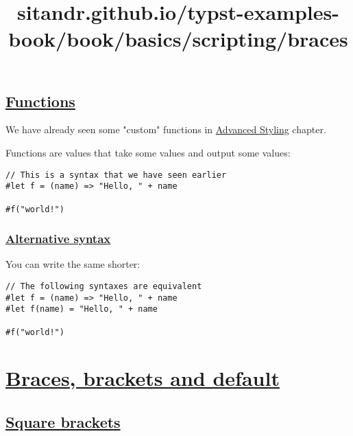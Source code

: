 \pandocbounded{}

\subsection{\texorpdfstring{\hyperref[functions]{Functions}}{Functions}}\label{functions}

We have already seen some "custom" functions in
\href{../tutorial/advanced_styling.html}{Advanced Styling} chapter.

Functions are values that take some values and output some values:

\begin{verbatim}
// This is a syntax that we have seen earlier
#let f = (name) => "Hello, " + name

#f("world!")
\end{verbatim}

\pandocbounded{}

\subsubsection{\texorpdfstring{\hyperref[alternative-syntax]{Alternative
syntax}}{Alternative syntax}}\label{alternative-syntax}

You can write the same shorter:

\begin{verbatim}
// The following syntaxes are equivalent
#let f = (name) => "Hello, " + name
#let f(name) = "Hello, " + name

#f("world!")
\end{verbatim}

\pandocbounded{}


\title{sitandr.github.io/typst-examples-book/book/basics/scripting/braces}

\section{\texorpdfstring{\hyperref[braces-brackets-and-default]{Braces,
brackets and
default}}{Braces, brackets and default}}\label{braces-brackets-and-default}

\subsection{\texorpdfstring{\hyperref[square-brackets]{Square
brackets}}{Square brackets}}\label{square-brackets}

